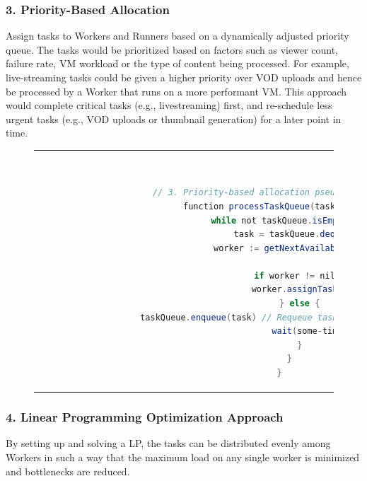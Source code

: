 \subsubsection{3. Priority-Based Allocation}
    Assign tasks to Workers and Runners based on a dynamically adjusted priority queue. The tasks would be prioritized based on factors such as viewer count, failure rate, \ac{VM} workload or the type of content being processed. For example, live-streaming tasks could be given a higher priority over \ac{VOD} uploads and hence be processed by a Worker that runs on a more performant \ac{VM}. This approach would complete critical tasks (e.g., livestreaming) first, and re-schedule less urgent tasks (e.g., \ac{VOD} uploads or thumbnail generation) for a later point in time.

    \begin{figure}[htpb]
      \begin{tabular}{c}
      \ \small \begin{lstlisting}[language=Java]
        // 3. Priority-based allocation pseudocode
        function processTaskQueue(taskQueue) {
            while not taskQueue.isEmpty() {
                task = taskQueue.dequeue()
                worker := getNextAvailableWorker()
                
                if worker != nil {
                    worker.assignTask(task)
                } else {
                    taskQueue.enqueue(task) // Requeue task if no Workers are available
                    wait(some-time)
                }
            }
        }
        \end{lstlisting}
      \end{tabular}
      \label{fig:priority-based-allocation}
    \end{figure}

\subsubsection{4. Linear Programming Optimization Approach}

By setting up and solving a \ac{LP}, the tasks can be distributed evenly among Workers in such a way that the maximum load on any single worker is minimized and bottlenecks are reduced.


